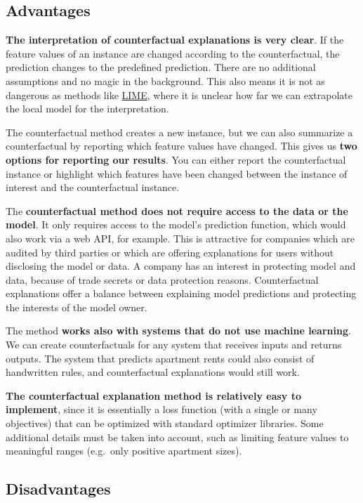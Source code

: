 \documentclass[
  10pt,
]{scrbook}
\begin{document}
\hypertarget{advantages-14}{%
\subsection{Advantages}\label{advantages-14}}

\textbf{The interpretation of counterfactual explanations is very clear}.
If the feature values of an instance are changed according to the counterfactual, the prediction changes to the predefined prediction.
There are no additional assumptions and no magic in the background.
This also means it is not as dangerous as methods like \protect\hyperlink{lime}{LIME}, where it is unclear how far we can extrapolate the local model for the interpretation.

The counterfactual method creates a new instance, but we can also summarize a counterfactual by reporting which feature values have changed.
This gives us \textbf{two options for reporting our results}.
You can either report the counterfactual instance or highlight which features have been changed between the instance of interest and the counterfactual instance.

The \textbf{counterfactual method does not require access to the data or the model}.
It only requires access to the model's prediction function, which would also work via a web API, for example.
This is attractive for companies which are audited by third parties or which are offering explanations for users without disclosing the model or data.
A company has an interest in protecting model and data, because of trade secrets or data protection reasons.
Counterfactual explanations offer a balance between explaining model predictions and protecting the interests of the model owner.

The method \textbf{works also with systems that do not use machine learning}.
We can create counterfactuals for any system that receives inputs and returns outputs.
The system that predicts apartment rents could also consist of handwritten rules, and counterfactual explanations would still work.

\textbf{The counterfactual explanation method is relatively easy to implement}, since it is essentially a loss function (with a single or many objectives) that can be optimized with standard optimizer libraries.
Some additional details must be taken into account, such as limiting feature values to meaningful ranges (e.g.~only positive apartment sizes).

\hypertarget{disadvantages-14}{%
\subsection{Disadvantages}\label{disadvantages-14}}
\end{document}
